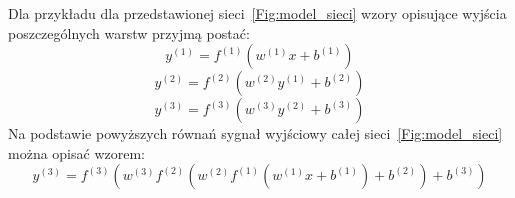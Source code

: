 \documentclass[12pt,twoside]{article}
\begin{document}
Dla przykładu dla przedstawionej sieci~\ref{Fig:model_sieci} wzory opisujące wyjścia poszczególnych warstw przyjmą postać:
\begin{equation}
	y^{(1)} = f^{(1)}(w^{(1)}x+b^{(1)})
\end{equation}
\begin{equation}
	y^{(2)} = f^{(2)}(w^{(2)}y^{(1)}+b^{(2)})
\end{equation}
\begin{equation}
	y^{(3)} = f^{(3)}(w^{(3)}y^{(2)}+b^{(3)})
\end{equation}
Na podstawie powyższych równań sygnał wyjściowy całej sieci~\ref{Fig:model_sieci} można opisać wzorem:
\begin{equation}
	y^{(3)}=f^{(3)}(w^{(3)}f^{(2)}(w^{(2)}f^{(1)}(w^{(1)}x+b^{(1)})+b^{(2)})+b^{(3)})
	\label{Eq:y_sieci}
\end{equation}
\newpage
\end{document}
